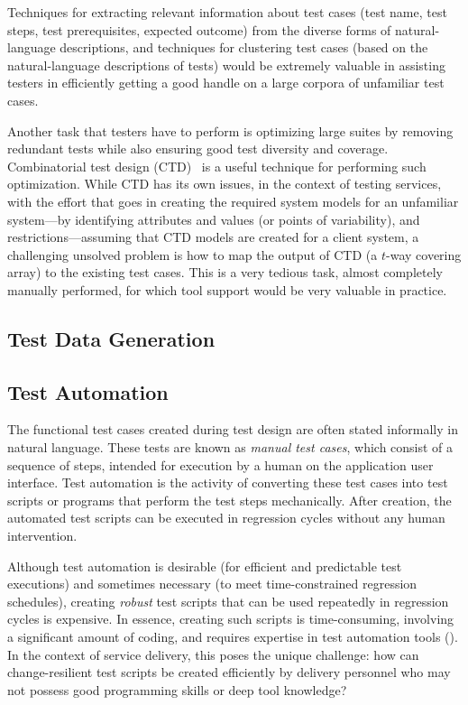 Techniques for extracting relevant information about test cases (\eg test name,
test steps, test prerequisites, expected outcome) from the diverse forms of
natural-language descriptions, and techniques for clustering test cases (based
on the natural-language descriptions of tests) would be extremely valuable in
assisting testers in efficiently getting a good handle on a large corpora of
unfamiliar test cases.

Another task that testers have to perform is optimizing large suites by removing
redundant tests while also ensuring good test diversity and
coverage. Combinatorial test design (CTD)~\cite{Cohen:1996, Cohen:1997,
  Cohen:2003} is a useful technique for performing such optimization. While CTD
has its own issues, in the context of testing services, with the effort that
goes in creating the required system models for an unfamiliar system---by
identifying attributes and values (or points of variability), and
restrictions---assuming that CTD models are created for a client system, a
challenging unsolved problem is how to map the output of CTD (\ie a $t$-way
covering array) to the existing test cases. This is a very tedious task, almost
completely manually performed, for which tool support would be very valuable in
practice.

\subsection{Test Data Generation}
\label{sec:test-data}



\subsection{Test Automation}
\label{sec:test-automation}

The functional test cases created during test design are often stated informally
in natural language. These tests are known as \textit{manual test cases}, which
consist of a sequence of steps, intended for execution by a human on the
application user interface.  Test automation is the activity of converting these
test cases into test scripts or programs that perform the test steps
mechanically. After creation, the automated test scripts can be executed in
regression cycles without any human intervention.

Although test automation is desirable (\eg for efficient and predictable test
executions) and sometimes necessary (\eg to meet time-constrained regression
schedules), creating \textit{robust} test scripts that can be used repeatedly in
regression cycles is expensive. In essence, creating such scripts is
time-consuming, involving a significant amount of coding, and requires expertise
in test automation tools (\eg \cite{hpqtp,ibmrft,selenium}). In the context of
service delivery, this poses the unique challenge: how can change-resilient test
scripts be created efficiently by delivery personnel who may not possess good
programming skills or deep tool knowledge?

